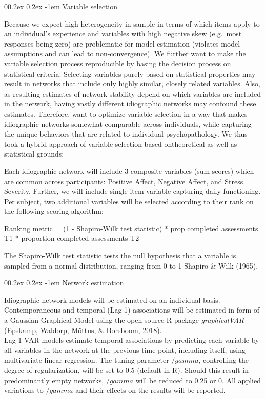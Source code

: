 \documentclass[
  english,
  man]{apa6}
\makeatletter
\let\oldparagraph\paragraph
\renewcommand{\paragraph}[1]{\oldparagraph{#1}\mbox{}}
\renewcommand{\paragraph}{\@startsection{paragraph}{4}{\parindent}%
  {0\baselineskip \@plus 0.2ex \@minus 0.2ex}%
  {-1em}%
  {\normalfont\normalsize\bfseries\itshape\typesectitle}}
\makeatother
\begin{document}
\hypertarget{variable-selection}{%
\paragraph{Variable selection}\label{variable-selection}}

Because we expect high heterogeneity in sample in terms of which items apply to an individual's experience and variables with high negative skew (e.g.~most responses being zero) are problematic for model estimation (violates model assumptions and can lead to non-convergence). We further want to make the variable selection process reproducible by basing the decision process on statistical criteria. Selecting variables purely based on statistical properties may result in networks that include only highly similar, closely related variables. Also, as resulting estimates of network stability depend on which variables are included in the network, having vastly different idiographic networks may confound these estimates. Therefore, want to optimize variable selection in a way that makes idiographic networks somewhat comparable across individuals, while capturing the unique behaviors that are related to individual psychopathology. We thus took a hybrid approach of variable selection based ontheoretical as well as statistical grounds:

Each idiographic network will include 3 composite variables (sum scores) which are common across participants: Positive Affect, Negative Affect, and Stress Severity. Further, we will include single-item variable capturing daily functioning. Per subject, two additional variables will be selected according to their rank on the following scoring algorithm:

Ranking metric = (1 - Shapiro-Wilk test statistic) * prop completed assessments T1 * proportion completed assessments T2

The Shapiro-Wilk test statistic tests the null hypothesis that a variable is sampled from a normal distribution, ranging from 0 to 1 Shapiro \& Wilk (1965).

\hypertarget{network-estimation}{%
\paragraph{Network estimation}\label{network-estimation}}

Idiographic network models will be estimated on an individual basis. Contemporaneous and temporal (Lag-1) associations will be estimated in form of a Gaussian Graphical Model using the open-source R package \emph{graphicalVAR} (Epskamp, Waldorp, Mõttus, \& Borsboom, 2018). \\
Lag-1 VAR models estimate temporal associations by predicting each variable by all variables in the network at the previous time point, including itself, using multivariate linear regression. The tuning parameter \(/gamma\), controlling the degree of regularization, will be set to 0.5 (default in R). Should this result in predominantly empty networks, \(/gamma\) will be reduced to 0.25 or 0. All applied variations to \(/gamma\) and their effects on the results will be reported.
\end{document}
